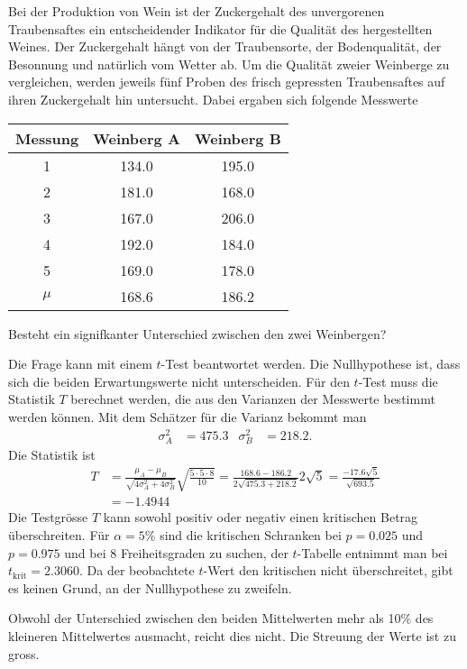 Bei der Produktion von Wein ist der Zuckergehalt des unvergorenen
Traubensaftes ein entscheidender Indikator für die Qualität des
hergestellten Weines. Der Zuckergehalt hängt von der Traubensorte,
der Bodenqualität, der Besonnung und natürlich vom Wetter ab.
Um die Qualität zweier Weinberge zu vergleichen, werden jeweils
fünf Proben
des frisch gepressten Traubensaftes auf ihren Zuckergehalt hin
untersucht. Dabei ergaben sich folgende Messwerte

\begin{center}
\begin{tabular}{|c|cc|}
\hline
Messung&Weinberg A&Weinberg B\\
\hline
1&134.0&195.0\\
2&181.0&168.0\\
3&167.0&206.0\\
4&192.0&184.0\\
5&169.0&178.0\\
\hline
$\mu$ &168.6&186.2\\
\hline
\end{tabular}
\end{center}
Besteht ein signifkanter Unterschied zwischen den zwei Weinbergen?

\begin{loesung}
Die Frage kann mit einem $t$-Test beantwortet werden.
Die Nullhypothese ist, dass sich die beiden Erwartungswerte
nicht unterscheiden. Für den $t$-Test muss die Statistik $T$
berechnet werden, die aus den Varianzen der Messwerte 
bestimmt werden können. Mit dem Schätzer für die Varianz
bekommt man
\begin{align*}
\sigma_A^2&=475.3&
\sigma_B^2&=218.2.
\end{align*}
Die Statistik ist
\begin{align*}
T&=\frac{\mu_A-\mu_B}{\sqrt{4\sigma_A^2+4\sigma_B^2}}\sqrt{\frac{5\cdot5\cdot 8}{10}}
=\frac{168.6-186.2}{2\sqrt{475.3+218.2}}2\sqrt{5}
=\frac{-17.6\sqrt{5}}{\sqrt{693.5}}
\\
&=-1.4944
\end{align*}
Die Testgrösse $T$ kann sowohl positiv oder negativ einen kritischen
Betrag überschreiten.
Für $\alpha=5\%$ sind die kritischen Schranken bei $p=0.025$ und $p=0.975$
und bei $8$ Freiheitsgraden zu suchen, der $t$-Tabelle entnimmt man
bei $t_{\text{krit}}=2.3060$. Da der beobachtete $t$-Wert den kritischen
nicht überschreitet, gibt es keinen Grund, an der Nullhypothese
zu zweifeln.

Obwohl der Unterschied zwischen den beiden Mittelwerten mehr als 10\%
des kleineren Mittelwertes ausmacht, reicht dies nicht. Die Streuung
der Werte ist zu gross.
\end{loesung}
